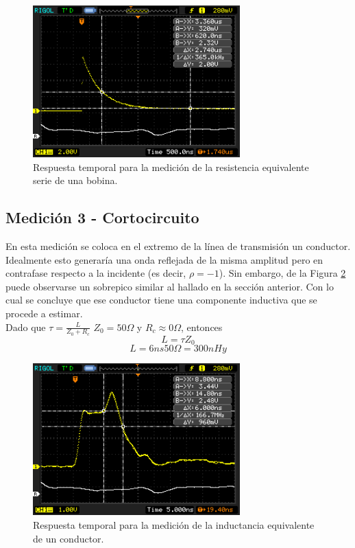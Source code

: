 \documentclass[a4paper,10pt]{article}
\begin{document}
		\begin{figure}[!htb]
			\centering
			\includegraphics[width=8cm]
			{Imagenes/InductorR.png}
			\caption{Respuesta temporal para la medici\'on de la resistencia 
			equivalente serie de una bobina.}
			\label{img007}
		\end{figure}			
	
	
	\subsection{Medición 3 - Cortocircuito}
	\indent En esta medici\'on se coloca en el extremo de la l\'inea de 
	transmisi\'on un conductor. Idealmente esto generar\'ia una onda reflejada
	de la misma amplitud pero en contrafase respecto a la incidente (es decir,
	$\rho=-1$). Sin embargo, de la Figura \ref{img008} puede observarse un 
	sobrepico similar al hallado en la secci\'on anterior. Con lo cual se 
	concluye que ese conductor tiene una componente inductiva que se procede a
	estimar. \\
	\indent Dado que $\tau=\frac{L}{Z_0+R_c}$ $Z_0=50\Omega$ y 
	$R_c\approx 0\Omega$, entonces
	$$L=\tau Z_0$$
	$$L=6ns 50\Omega=300nHy$$

		\begin{figure}[!htb]
			\centering
			\includegraphics[width=8cm]
			{Imagenes/CORTO.png}
			\caption{Respuesta temporal para la medici\'on de la inductancia 
			equivalente de un conductor.}
			\label{img008}
		\end{figure}
		
\end{document}
